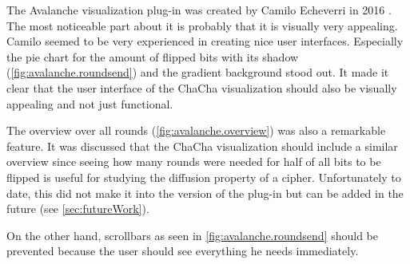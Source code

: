 The Avalanche visualization plug-in was created by Camilo Echeverri in 2016 \cite{AvalancheVisualization}. The most noticeable part about it is probably that it is visually very appealing. Camilo seemed to be very experienced in creating nice user interfaces. Especially the pie chart for the amount of flipped bits with its shadow (\autoref{fig:avalanche.roundsend}) and the gradient background stood out. It made it clear that the user interface of the ChaCha visualization should also be visually appealing and not just functional.

The overview over all rounds (\autoref{fig:avalanche.overview}) was also a remarkable feature. It was discussed that the ChaCha visualization should include a similar overview since seeing how many rounds were needed for half of all bits to be flipped is useful for studying the diffusion property of a cipher. Unfortunately to date, this did not make it into the version of the plug-in but can be added in the future (see \autoref{sec:futureWork}).

On the other hand, scrollbars as seen in \autoref{fig:avalanche.roundsend} should be prevented because the user should see everything he needs immediately.

